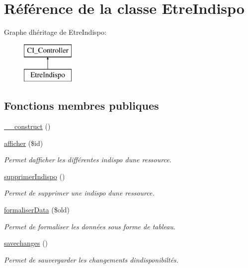 \hypertarget{class_etre_indispo}{}\section{Référence de la classe Etre\+Indispo}
\label{class_etre_indispo}
Graphe d\textquotesingle{}héritage de Etre\+Indispo\+:\begin{figure}[H]
\begin{center}
\leavevmode
\includegraphics[height=2.000000cm]{class_etre_indispo}
\end{center}
\end{figure}
\subsection*{Fonctions membres publiques}
\begin{DoxyCompactItemize}
\item 
\hyperlink{class_etre_indispo_ab473b67e6c40586cbe176ee494255e95}{\+\_\+\+\_\+construct} ()
\item 
\hyperlink{class_etre_indispo_a48a60560b43b98fcd18b50d7dd81f494}{afficher} (\$id)
\begin{DoxyCompactList}\small\item\em Permet d\textquotesingle{}afficher les différentes indispo d\textquotesingle{}une ressource. \end{DoxyCompactList}\item 
\hyperlink{class_etre_indispo_aed2a2b519e434b4f79901c59ea5d06d3}{supprimer\+Indispo} ()
\begin{DoxyCompactList}\small\item\em Permet de supprimer une indispo d\textquotesingle{}une ressource. \end{DoxyCompactList}\item 
\hyperlink{class_etre_indispo_a8b23db72e0f57f12cd6f863ea80963a6}{formaliser\+Data} (\$old)
\begin{DoxyCompactList}\small\item\em Permet de formaliser les données sous forme de tableau. \end{DoxyCompactList}\item 
\hyperlink{class_etre_indispo_ab404c3ce5a468289a479029a3d5dc970}{savechanges} ()
\begin{DoxyCompactList}\small\item\em Permet de sauvergarder les changements d\textquotesingle{}indisponibiltés. \end{DoxyCompactList}\end{DoxyCompactItemize}


